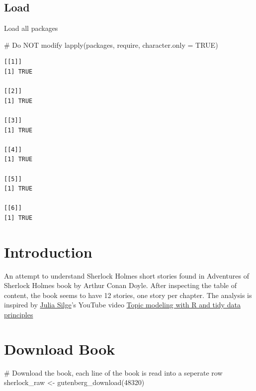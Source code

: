 \documentclass[
  letterpaper,
  DIV=11,
  numbers=noendperiod]{scrreprt}
\newenvironment{Shaded}{\begin{snugshade}}{\end{snugshade}}
\newcommand{\AttributeTok}[1]{\textcolor[rgb]{0.40,0.45,0.13}{#1}}
\newcommand{\CommentTok}[1]{\textcolor[rgb]{0.37,0.37,0.37}{#1}}
\newcommand{\ConstantTok}[1]{\textcolor[rgb]{0.56,0.35,0.01}{#1}}
\newcommand{\DecValTok}[1]{\textcolor[rgb]{0.68,0.00,0.00}{#1}}
\newcommand{\FunctionTok}[1]{\textcolor[rgb]{0.28,0.35,0.67}{#1}}
\newcommand{\NormalTok}[1]{\textcolor[rgb]{0.00,0.23,0.31}{#1}}
\newcommand{\OtherTok}[1]{\textcolor[rgb]{0.00,0.23,0.31}{#1}}
\begin{document}
\subsection*{Load}\label{load-8}

Load all packages

\begin{Shaded}
\begin{Highlighting}[]
\CommentTok{\# Do NOT modify}
\FunctionTok{lapply}\NormalTok{(packages, require, }\AttributeTok{character.only =} \ConstantTok{TRUE}\NormalTok{)}
\end{Highlighting}
\end{Shaded}

\begin{verbatim}
[[1]]
[1] TRUE

[[2]]
[1] TRUE

[[3]]
[1] TRUE

[[4]]
[1] TRUE

[[5]]
[1] TRUE

[[6]]
[1] TRUE
\end{verbatim}

\section{Introduction}\label{introduction-5}

An attempt to understand Sherlock Holmes short stories found in
Adventures of Sherlock Holmes book by Arthur Conan Doyle. After
inspecting the table of content, the book seems to have 12 stories, one
story per chapter. The analysis is inspired by
\href{https://juliasilge.com/}{Julia Silge}'s YouTube video
\href{https://www.youtube.com/embed/evTuL-RcRpc}{Topic modeling with R
and tidy data principles}

\section{Download Book}\label{download-book}

\begin{Shaded}
\begin{Highlighting}[]
\CommentTok{\# Download the book, each line of the book is read into a seperate row}
\NormalTok{sherlock\_raw }\OtherTok{\textless{}{-}} \FunctionTok{gutenberg\_download}\NormalTok{(}\DecValTok{48320}\NormalTok{)}
\end{Highlighting}
\end{Shaded}
\end{document}
